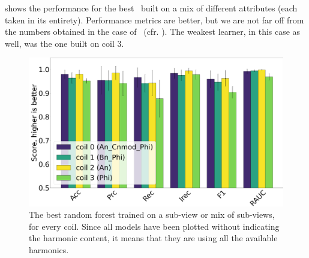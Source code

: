  shows the performance for the best \rfs\ built on a mix of different attributes
(each taken in its entirety). Performance metrics are better, but we are not far off from the numbers obtained in the case of \dts\ (cfr. ). The weakest learner, in this case as well, was the one built on coil $3$.
\begin{figure}
	\centering
	\includegraphics[width=\linewidth]{img/best_rfs_qlp.png}
	\caption{The best random forest trained on a sub-view or mix of sub-views, for every coil.
		Since all models have been plotted without indicating the harmonic content, it means
		that they are using all the available harmonics.}\label{fig:brfs-qlp}
\end{figure}


